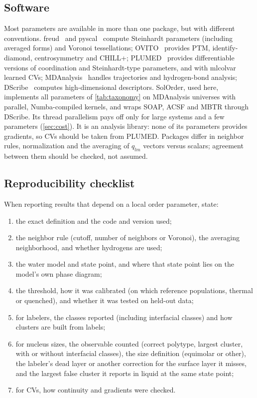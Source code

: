 \documentclass[11pt,a4paper]{article}
\begin{document}
\subsection{Software}
Most parameters are available in more than one package, but with different
conventions. freud~\cite{Ramasubramani2020} and pyscal~\cite{Menon2019}
compute Steinhardt parameters (including averaged forms) and Voronoi
tessellations; OVITO~\cite{Stukowski2010} provides PTM, identify-diamond,
centrosymmetry and CHILL+; PLUMED~\cite{Tribello2014,PLUMED2019} provides
differentiable versions of coordination and Steinhardt-type parameters, and
with mlcolvar~\cite{Bonati2023} learned CVs;
MDAnalysis~\cite{MichaudAgrawal2011,Gowers2016} handles trajectories and
hydrogen-bond analysis; DScribe~\cite{Himanen2020} computes high-dimensional
descriptors. SolOrder, used here, implements all parameters of
\cref{tab:taxonomy} on MDAnalysis universes with parallel, Numba-compiled
kernels, and wraps SOAP, ACSF and MBTR through DScribe. Its thread
parallelism pays off only for large systems and a few parameters
(\cref{sec:cost}). It is an analysis
library: none of its parameters provides gradients, so CVs should be taken
from PLUMED. Packages differ in neighbor rules, normalization and the
averaging of $q_{lm}$ vectors versus scalars; agreement between them should
be checked, not assumed.

\subsection{Reproducibility checklist}
When reporting results that depend on a local order parameter, state:
\begin{enumerate}
\item the exact definition and the code and version used;
\item the neighbor rule (cutoff, number of neighbors or Voronoi), the
averaging neighborhood, and whether hydrogens are used;
\item the water model and state point, and where that state point lies on
the model's own phase diagram;
\item the threshold, how it was calibrated (on which reference populations,
thermal or quenched), and whether it was tested on held-out data;
\item for labelers, the classes reported (including interfacial classes) and
how clusters are built from labels;
\item for nucleus sizes, the observable counted (correct polytype, largest
cluster, with or without interfacial classes), the size definition
(equimolar or other), the labeler's dead layer or another correction for the surface
layer it misses, and the largest false cluster it reports in liquid at the
same state point;
\item for CVs, how continuity and gradients were checked.
\end{enumerate}
\end{document}
